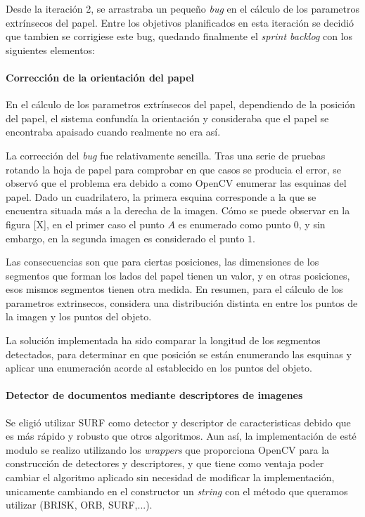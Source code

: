 Desde la iteración 2, se arrastraba un pequeño \textit{bug} en el cálculo de los parametros extrínsecos del papel. Entre los objetivos planificados en esta iteración se decidió que tambien se corrigiese este bug, quedando finalmente el \textit{sprint backlog} con los siguientes elementos:

\paragraph{Corrección de la orientación del papel}
En el cálculo de los parametros extrínsecos del papel, dependiendo de la posición del papel, el sistema confundía la orientación y consideraba que el papel se encontraba apaisado cuando realmente no era así.

La corrección del \textit{bug} fue relativamente sencilla. Tras una serie de pruebas rotando la hoja de papel para comprobar en que casos se producia el error, se observó que el problema era debido a como OpenCV enumerar las esquinas del papel. Dado un cuadrilatero, la primera esquina corresponde a la que se encuentra situada más a la derecha de la imagen. Cómo se puede observar en la figura [X], en el primer caso el punto $A$ es enumerado como punto $0$, y sin embargo, en la segunda imagen es considerado el punto $1$. 

Las consecuencias son que para ciertas posiciones, las dimensiones de los segmentos que forman los lados del papel tienen un valor, y en otras posiciones, esos mismos segmentos tienen otra medida. En resumen, para el cálculo de los parametros extrinsecos, considera una distribución distinta en entre los puntos de la imagen y los puntos del objeto.

La solución implementada ha sido comparar la longitud de los segmentos detectados, para determinar en que posición se están enumerando las esquinas y aplicar una enumeración acorde al establecido en los puntos del objeto. 
 
\paragraph{Detector de documentos mediante descriptores de imagenes} 
Se eligió utilizar SURF como detector y descriptor de caracteristicas debido que es más rápido y robusto que otros algoritmos. Aun así, la implementación de esté modulo se realizo utilizando los \textit{wrappers} que proporciona OpenCV para la construcción de detectores y descriptores, y que tiene como ventaja poder cambiar el algoritmo aplicado sin necesidad de modificar la implementación, unicamente cambiando en el constructor un \textit{string} con el método que queramos utilizar (BRISK, ORB, SURF,...).

